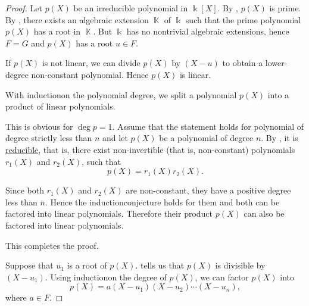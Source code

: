 \begin{proof}
   Let \( p(X) \) be an irreducible polynomial in \( \Bbbk[X] \). By , \( p(X) \) is prime. By , there exists an algebraic extension \( \BbbK \) of \( \Bbbk \) such that the prime polynomial \( p(X) \) has a root in \( \BbbK \). But \( \Bbbk \) has no nontrivial algebraic extensions, hence \( F = G \) and \( p(X) \) has a root \( u \in F \).

  If \( p(X) \) is not linear\LEM, we can divide \( p(X) \) by \( (X - u) \) to obtain a lower-degree non-constant polynomial. Hence \( p(X) \) is linear.

   With induction\IND on the polynomial degree, we split a polynomial \( p(X) \) into a product of linear polynomials.

  This is obvious for \( \deg p = 1 \). Assume that the statement holds for polynomial of degree strictly less than \( n \) and let \( p(X) \) be a polynomial of degree \( n \). By , it is \hyperref[def:irreducible_ring_element]{reducible}, that is, there exist non-invertible (that is, non-constant) polynomials \( r_1(X) \) and \( r_2(X) \), such that
  \begin{equation*}
    p(X) = r_1(X) r_2(X).
  \end{equation*}

  Since both \( r_1(X) \) and \( r_2(X) \) are non-constant, they have a positive degree less than \( n \). Hence the induction\IND conjecture holds for them and both can be factored into linear polynomials. Therefore their product \( p(X) \) can also be factored into linear polynomials.

  This completes the proof.

   Suppose that \( u_1 \) is a root of \( p(X) \).  tells us that \( p(X) \) is divisible by \( (X - u_1) \). Using induction\IND on the degree of \( p(X) \), we can factor \( p(X) \) into
  \begin{equation*}
    p(X) = a (X - u_1) (X - u_2) \cdots (X - u_n),
  \end{equation*}
  where \( a \in F \).


\end{proof}
